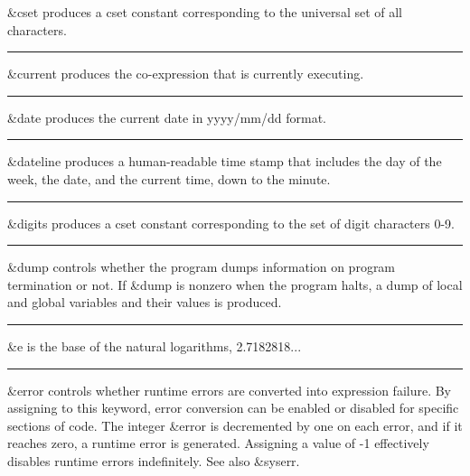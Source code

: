 \noindent
{}\textsf{\&cset} produces a cset constant
corresponding to the universal set of all characters.

\bigskip\hrule\vspace{0.1cm}

\noindent
{}\textsf{\&current} produces the
co-expression that is currently executing.

\bigskip\hrule\vspace{0.1cm}

\noindent
{}\textsf{\&date} produces the current
date in yyyy/mm/dd format.

\bigskip\hrule\vspace{0.1cm}

\noindent
{}\textsf{\&dateline} produces a human-readable time
stamp that includes the day of the week, the date, and the current
time, down to the minute.

\bigskip\hrule\vspace{0.1cm}

\noindent
{}\textsf{\&digits} produces a cset constant
corresponding to the set of digit characters 0-9.

\bigskip\hrule\vspace{0.1cm}

\noindent
\textsf{\&dump} controls whether the program dumps information on
program termination or not. If \textsf{\&dump} is nonzero when the
program halts, a dump of local and global variables and their values is
produced.

\bigskip\hrule\vspace{0.1cm}

\noindent
{}\textsf{\&e} is the base of the natural
logarithms, 2.7182818...

\bigskip\hrule\vspace{0.1cm}

\noindent
{}\textsf{\&error} controls whether
runtime errors are converted into expression failure. By assigning to
this keyword, error conversion can be enabled or disabled for specific
sections of code. The integer \&error is decremented by one on each
error, and if it reaches zero, a runtime error is generated. Assigning
a value of -1 effectively disables runtime errors indefinitely. See
also \textsf{\&syserr}.

